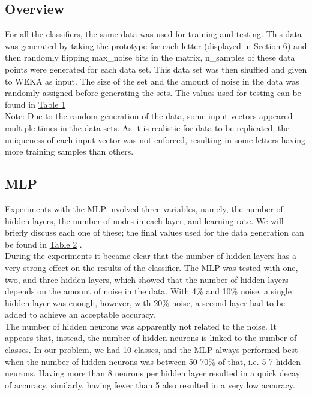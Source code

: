 \documentclass{article}
\begin{document}
	\subsection{Overview}
		For all the classifiers, the same data was used for training and testing. This data was generated by taking the prototype for each letter (displayed in \hyperref[S6]{Section 6}) and then randomly flipping max\_noise bits in the matrix, n\_samples of these data points were generated for each data set. This data set was then shuffled and given to WEKA as input. The size of the set and the amount of noise in the data was randomly assigned before generating the sets. The values used for testing can be found in \hyperref[Test_Setup]{Table 1}\\
		
		Note: Due to the random generation of the data, some input vectors appeared multiple times in the data sets. As it is realistic for data to be replicated, the uniqueness of each input vector was not enforced, resulting in some letters having more training samples than others.\\
		
	
	\subsection{MLP}
		Experiments with the MLP involved three variables, namely, the number of hidden layers, the number of nodes in each layer, and learning rate. We will briefly discuss each one of these; the final values used for the data generation can be found in \hyperref[MLP_In]{Table 2} .\\
		
		During the experiments it became clear that the number of hidden layers has a very strong effect on the results of the classifier. The MLP was tested with one, two, and three hidden layers, which showed that the number of hidden layers depends on the amount of noise in the data. With 4\% and 10\% noise, a single hidden layer was enough, however, with 20\% noise, a second layer had to be added to achieve an acceptable accuracy.\\
		
		The number of hidden neurons was apparently not related to the noise. It appears that, instead, the number of hidden neurons is linked to the number of classes. In our problem, we had 10 classes, and the MLP always performed best when the number of hidden neurons was between 50-70\% of that, i.e. 5-7 hidden neurons. Having more than 8 neurons per hidden layer resulted in a quick decay of accuracy, similarly, having fewer than 5 also resulted in a very low accuracy. \\
		
\end{document}
